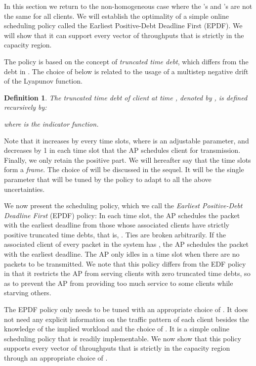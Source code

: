 \documentclass[10pt,nocopyrightspace]{sigplan-proc-varsize-1in}
\newtheorem{definition}{Definition}
\begin{document}
In this section we return to the non-homogeneous case where the 's and 's are not the same for all clients.  
We will establish the optimality of a simple online scheduling policy called the Earliest Positive-Debt Deadline First (EPDF). We will show that it
can support every vector of throughputs that
is strictly in the capacity region.  

The policy is based on the concept of \emph{truncated time debt}, which differs from the debt in \cite{IH09}. The choice of  below is related to the usage of a multistep negative drift of the Lyapunov function.

\begin{definition}  \label{definition:scheduling:debt}
The \emph{truncated time debt} of client  at time , denoted by , is defined recursively by:

where  is the indicator function.
\end{definition}

Note that it increases by  every  time slots, where  is an adjustable parameter, and decreases by 1 in each time slot that the AP schedules client  for transmission. Finally, we only retain the positive part. We will hereafter say that the  time slots form a \emph{frame}. The choice of  will be discussed in the sequel. It will be the single parameter that will be tuned by the policy to adapt to all the above uncertainties.

We now present the scheduling policy, which we call the \emph{Earliest Positive-Debt Deadline First} (EPDF) policy: In each time slot, the AP schedules the packet with the earliest deadline from those whose associated clients have strictly positive truncated time debts, that is, . Ties are broken arbitrarily. If the associated client of every packet in the system has , the AP schedules the packet with the earliest deadline. The AP only idles in a time slot when there are no packets to be transmitted. We note that this policy differs from the EDF policy in that it restricts the AP from serving clients with zero truncated time debts, so as to prevent the AP from providing too much service to some clients while starving others.

The EPDF policy only needs to be tuned with an appropriate choice of . It does not need any explicit information on the traffic pattern of each client besides the knowledge of the implied workload and the choice of . It is a simple online scheduling policy that is readily implementable. We now show that this policy supports every vector of throughputs that is strictly in the capacity region through an appropriate choice of . 
\end{document}
